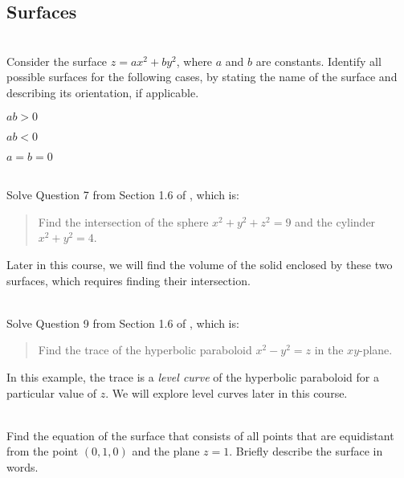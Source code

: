 \subsection{Surfaces}
\BEN
\item {}\\
Consider the surface $z=ax^2 + by^2$, where $a$ and $b$ are constants. Identify all possible surfaces for the following cases, by stating the name of the surface and describing its orientation, if applicable. 
\BEN
\item $ab > 0$
\item $ab < 0$
\item $a=b = 0$
\EEN
\item 
{}\\
Solve Question 7 from Section 1.6 of \VCT, which is: 
\begin{quotation}
\noindent
Find the intersection of the sphere $x^2+y^2+z^2 =9$ and the cylinder $x^2+y^2 =4$.
\end{quotation}
Later in this course, we will find the volume of the solid enclosed by these two surfaces, which requires finding their intersection.
\item 
{}\\
Solve Question 9 from Section 1.6 of \VCT, which is: 
\begin{quotation}
\noindent
Find the trace of the hyperbolic paraboloid $x^2- y^2 = z$ in the $xy$-plane.
\end{quotation}
In this example, the trace is a \textit{level curve} of the hyperbolic paraboloid for a particular value of $z$. We will explore level curves later in this course. 
\item 
{}\\
Find the equation of the surface that consists of all points that are equidistant from the point $(0,1,0)$ and the plane $z = 1$. Briefly describe the surface in words.

\EEN